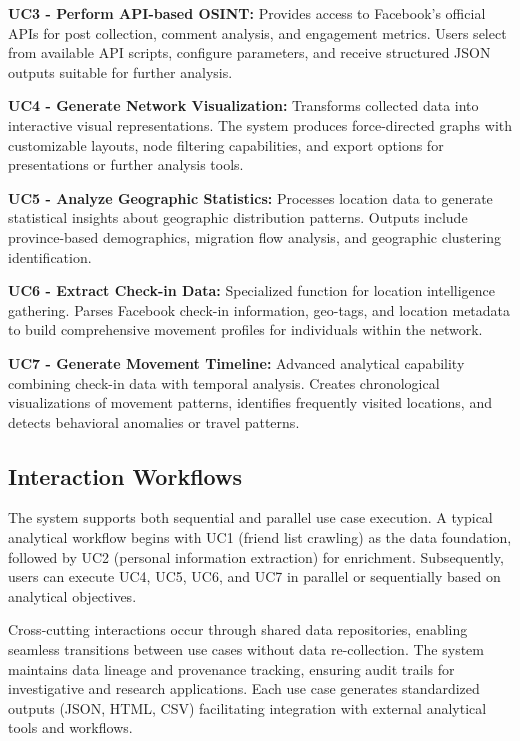 \documentclass[13pt,a4paper]{report}
\begin{document}
\textbf{UC3 - Perform API-based OSINT:} Provides access to Facebook's official APIs for post collection, comment analysis, and engagement metrics. Users select from available API scripts, configure parameters, and receive structured JSON outputs suitable for further analysis.

\textbf{UC4 - Generate Network Visualization:} Transforms collected data into interactive visual representations. The system produces force-directed graphs with customizable layouts, node filtering capabilities, and export options for presentations or further analysis tools.

\textbf{UC5 - Analyze Geographic Statistics:} Processes location data to generate statistical insights about geographic distribution patterns. Outputs include province-based demographics, migration flow analysis, and geographic clustering identification.

\textbf{UC6 - Extract Check-in Data:} Specialized function for location intelligence gathering. Parses Facebook check-in information, geo-tags, and location metadata to build comprehensive movement profiles for individuals within the network.

\textbf{UC7 - Generate Movement Timeline:} Advanced analytical capability combining check-in data with temporal analysis. Creates chronological visualizations of movement patterns, identifies frequently visited locations, and detects behavioral anomalies or travel patterns.

\subsection{Interaction Workflows}
The system supports both sequential and parallel use case execution. A typical analytical workflow begins with UC1 (friend list crawling) as the data foundation, followed by UC2 (personal information extraction) for enrichment. Subsequently, users can execute UC4, UC5, UC6, and UC7 in parallel or sequentially based on analytical objectives.

Cross-cutting interactions occur through shared data repositories, enabling seamless transitions between use cases without data re-collection. The system maintains data lineage and provenance tracking, ensuring audit trails for investigative and research applications. Each use case generates standardized outputs (JSON, HTML, CSV) facilitating integration with external analytical tools and workflows.

\end{document}
